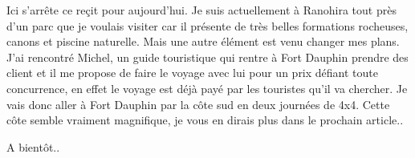 \begin{multicols}{2}

Ici s'arrête ce reçit pour aujourd'hui. Je suis actuellement à Ranohira tout près d'un parc que je voulais visiter car il présente de très belles formations rocheuses, canons et piscine naturelle. Mais une autre élément est venu changer mes plans. J'ai rencontré Michel, un guide touristique qui rentre à Fort Dauphin prendre des client et il me propose de faire le voyage avec lui pour un prix défiant toute concurrence, en effet le voyage est déjà payé par les touristes qu'il va chercher. Je vais donc aller à Fort Dauphin par la côte sud en deux journées de 4x4. Cette côte semble vraiment magnifique, je vous en dirais plus dans le prochain article..

A bientôt..

\end{multicols}


